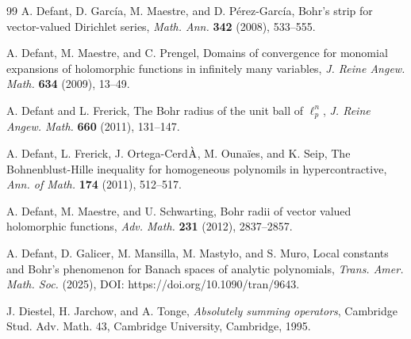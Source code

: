 \documentclass[a4paper,11pt, reqno]{amsart}
\theoremstyle{definition}
\begin{document}
\begin{thebibliography}{99}
			 {\sc A. Defant, D. Garc\'{i}a, M. Maestre}, and {\sc D. P\'{e}rez-Garc\'{i}a}, Bohr's strip for vector-valued Dirichlet series, {\it Math. Ann.} {\bf 342} (2008), 533--555.
	
		 {\sc A. Defant,  M. Maestre}, and {\sc  C. Prengel}, Domains of convergence for monomial expansions of holomorphic functions in infinitely many variables, {\it J. Reine Angew. Math.} {\bf 634} (2009), 13--49.
	
	 {\sc A. Defant} and {\sc L. Frerick}, The Bohr radius of the unit ball of $\ell^n _p$, {\it J. Reine Angew. Math.} {\bf 660} (2011), 131--147.
	
	 {\sc A. Defant, L. Frerick, J. Ortega-Cerd${\rm \grave{A}}$, M. Ouna{\"i}es}, and {\sc K. Seip}, The Bohnenblust-Hille inequality for homogeneous polynomils in hypercontractive, {\it Ann. of Math.} {\bf 174} (2011), 512--517.
	
	
	
	
	
	 {\sc A. Defant, M. Maestre}, and {\sc  U. Schwarting}, Bohr radii of vector valued holomorphic functions, {\it Adv. Math.} {\bf 231} (2012), 2837--2857.
	
	 {\sc A. Defant, D. Galicer, M. Mansilla, M. Mastyło}, and {\sc  S. Muro}, Local constants and Bohr’s phenomenon for Banach spaces of analytic polynomials, {\it Trans. Amer. Math. Soc. }(2025), DOI: https://doi.org/10.1090/tran/9643.
	
	
	 {\sc J. Diestel, H. Jarchow}, and {\sc A. Tonge}, {\it Absolutely summing operators}, Cambridge Stud. Adv. Math. 43, Cambridge University, Cambridge, 1995.
	

\end{thebibliography}
\end{document}
